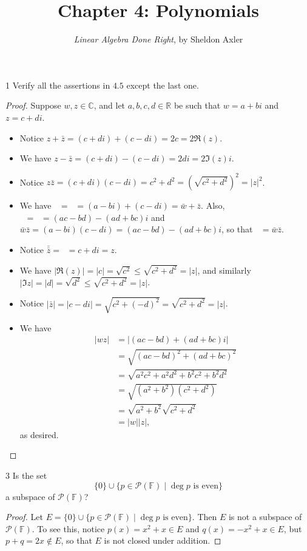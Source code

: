 \documentclass{extarticle}
\title{\vspace{-2em}Chapter 4: Polynomials}
\author{\emph{Linear Algebra Done Right}, by Sheldon Axler}
\date{}
\newenvironment{problem}[1]{\begin{prob*}{#1}{}}{\end{prob*}}
\newcommand{\R}{\mathbb{R}}
\newcommand{\C}{\mathbb{C}}
\newcommand{\F}{\mathbb{F}}
\newcommand{\poly}{\mathcal{P}}
\newcommand\widebar[1]{\mathop{\overline{#1}}}
\begin{document}
\maketitle


\begin{problem}{1}
Verify all the assertions in $4.5$ except the last one.
\end{problem}
\begin{proof}
Suppose $w,z \in\C$, and let $a,b,c,d\in\R$ be such that $w = a+bi$ and $z = c + di$.
\begin{itemize}
\item Notice $z + \bar{z} = (c + di) + (c - di) = 2c = 2\Re(z)$.
\item We have $z - \bar{z} = (c + di) - (c - di) = 2di = 2\Im(z)i$.  
\item Notice $z\bar{z} = (c + di)(c - di) = c^2 + d^2 = \left(\sqrt{c^2 + d^2}\right)^2 = \left |z\right |^2$.
\item We have $\widebar{w + z} = \widebar{(a + c) + (b + d)i} = (a - bi) + (c - di) = \bar{w} + \bar{z}$.  Also, $\widebar{wz} = \widebar{(ac - bd) + (ad + bc)i} = (ac - bd) - (ad + bc)i$ and $\bar{w}\bar{z} = (a-bi)(c-di) = (ac - bd)-(ad + bc)i$, so that $\widebar{wz} = \bar{w}\bar{z}$.
\item Notice $\bar{\bar{z}} = \widebar{c - di} = c + di = z$.
\item We have $\left|\Re(z)\right| = \left|c\right| = \sqrt{c^2}\leq \sqrt{c^2 + d^2} = \left|z\right|$, and similarly $\left|\Im{z}\right| = \left|d\right| = \sqrt{d^2}\leq \sqrt{c^2 + d^2} = \left|z\right|$.
\item Notice $\left|\bar{z}\right| = \left|c - di\right| = \sqrt{c^2 + (-d)^2} = \sqrt{c^2 + d^2} = \left|z\right|$.
\item We have 
\begin{align*}
\left|wz\right| &= \left|(ac - bd) + (ad + bc)i\right|\\
&= \sqrt{(ac - bd)^2 + (ad + bc)^2}\\
&= \sqrt{a^2c^2 + a^2d^2 +b^2c^2 + b^2d^2}\\
&= \sqrt{(a^2 + b^2)(c^2 + d^2)}\\
&= \sqrt{a^2 + b^2}\sqrt{c^2 + d^2}\\
&= \left|w\right|\left| z\right|,
\end{align*}
as desired. \qedhere
\end{itemize}
\end{proof}

\begin{problem}{3}
Is the set
\begin{equation*}
\{0\} \cup \{p\in\poly(\F)\mid \deg p\text{ is even}\}
\end{equation*}
a subspace of $\poly(\F)$?
\end{problem}
\begin{proof}
Let $E = \{0\} \cup \{p\in\poly(\F)\mid \deg p\text{ is even}\}$.  Then $E$ is not a subspace of $\poly(\F)$.  To see this, notice $p(x) = x^2 + x\in E$ and $q(x) = -x^2 + x\in E$, but $p + q = 2x\not\in E$, so that $E$ is not closed under addition.
\end{proof}
\end{document}
